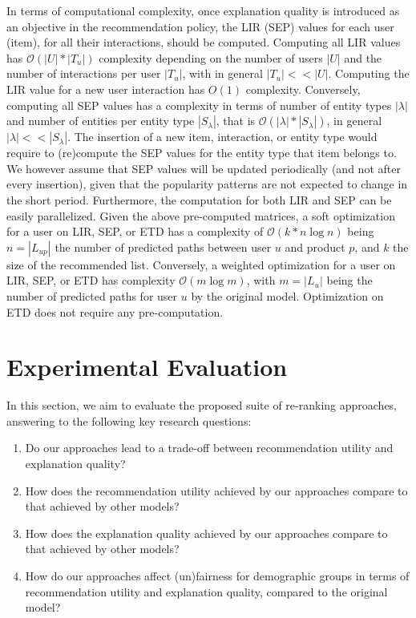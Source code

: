 \documentclass[sigconf]{acmart}
\def\threedigits#1{\number#1}
\begin{document}
\vspace{1mm} In terms of computational complexity, once explanation quality is introduced as an objective in the recommendation policy, the LIR (SEP) values for each user (item), for all their interactions, should be computed. Computing all LIR values has $\mathcal{O}(|U| * |T_u|)$ complexity depending on the number of users $|U|$ and the number of interactions per user $|T_u|$, with in general $|T_u| < < |U|$. Computing the LIR value for a new user interaction has $O(1)$ complexity. Conversely, computing all SEP values has a complexity in terms of number of entity types $|\lambda|$ and number of entities per entity type $|S_{\lambda}|$, that is $\mathcal{O}(|\lambda| * |S_{\lambda}|)$, in general $|\lambda| < < |S_{\lambda}|$.  The insertion of a new item, interaction, or entity type would require to (re)compute the SEP values for the entity type that item belongs to. We however assume that SEP values will be updated periodically (and not after every insertion), given that the popularity patterns are not expected to change in the short period. Furthermore, the computation for both LIR and SEP can be easily parallelized. Given the above pre-computed matrices, a soft optimization for a user on LIR, SEP, or ETD has a complexity of $\mathcal{O}(k * n\log{}n)$ being $n = |L_{up}|$ the number of predicted paths between user $u$ and product $p$, and $k$ the size of the recommended list. Conversely, a weighted optimization for a user on LIR, SEP, or ETD has complexity $\mathcal{O}(m\log{}m)$, with $m = |L_{u}|$ being the number of predicted paths for user $u$ by the original model. Optimization on ETD does not require any pre-computation. 

\section{Experimental Evaluation}\label{sec:experiments}
In this section, we aim to evaluate the proposed suite of re-ranking approaches, answering to the following key research questions:

\begin{enumerate}[label={\textbf{RQ\protect\threedigits{\theenumi}}}, leftmargin=*]
    \item Do our approaches lead to a trade-off between recommendation utility and explanation quality?
    \item How does the recommendation utility achieved by our approaches compare to that achieved by other models?
    \item How does the explanation quality achieved by our approaches compare to that achieved by other models?
    \item How do our approaches affect (un)fairness for demographic groups in terms of recommendation utility and explanation quality, compared to the original model?
\end{enumerate}
\end{document}
